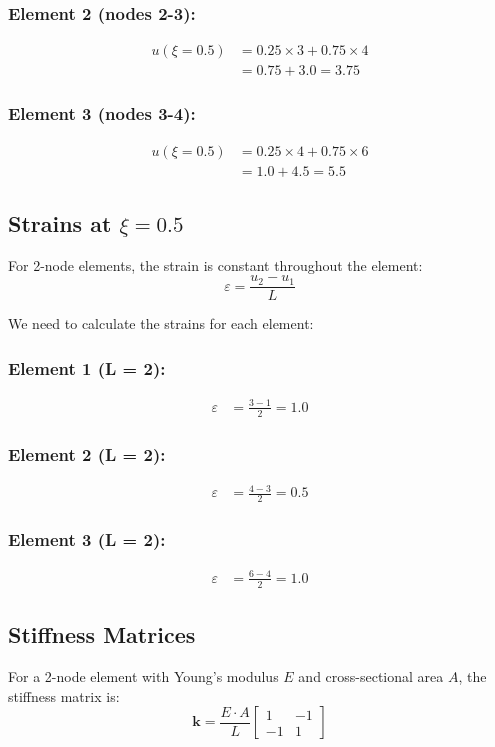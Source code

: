 \documentclass[12pt,a4paper]{article}
\begin{document}
\subsubsection*{Element 2 (nodes 2-3):}
\begin{align}
u(\xi=0.5) &= 0.25 \times 3 + 0.75 \times 4 \\
&= 0.75 + 3.0 = 3.75
\end{align}

\subsubsection*{Element 3 (nodes 3-4):}
\begin{align}
u(\xi=0.5) &= 0.25 \times 4 + 0.75 \times 6 \\
&= 1.0 + 4.5 = 5.5
\end{align}

\subsection{Strains at $\xi = 0.5$}
For 2-node elements, the strain is constant throughout the element:
\begin{equation}
\varepsilon = \frac{u_2 - u_1}{L}
\end{equation}

We need to calculate the strains for each element:

\subsubsection*{Element 1 (L = 2):}
\begin{align}
\varepsilon &= \frac{3 - 1}{2} = 1.0
\end{align}

\subsubsection*{Element 2 (L = 2):}
\begin{align}
\varepsilon &= \frac{4 - 3}{2} = 0.5
\end{align}

\subsubsection*{Element 3 (L = 2):}
\begin{align}
\varepsilon &= \frac{6 - 4}{2} = 1.0
\end{align}

\subsection{Stiffness Matrices}
For a 2-node element with Young's modulus $E$ and cross-sectional area $A$, the stiffness matrix is:
\begin{equation}
\mathbf{k} = \frac{E \cdot A}{L} \begin{bmatrix} 1 & -1 \\ -1 & 1 \end{bmatrix}
\end{equation}
\end{document}

